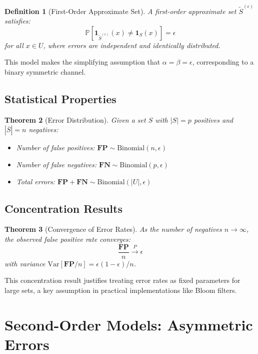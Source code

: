\documentclass[11pt]{article}
\newtheorem{theorem}{Theorem}[section]
\newtheorem{definition}[theorem]{Definition}
\newcommand{\observed}[1]{\tilde{#1}}  %
\newcommand{\prob}[1]{\mathbb{P}\left[#1\right]}
\newcommand{\var}[1]{\text{Var}\left[#1\right]}
\newcommand{\indicator}[1]{\mathbf{1}_{#1}}
\newcommand{\card}[1]{|#1|}
\renewcommand{\complement}[1]{\overline{#1}}
\newcommand{\fprate}{\alpha}  %
\newcommand{\fnrate}{\beta}   %
\newcommand{\RV}[1]{\mathbf{#1}}
\newcommand{\FP}{\RV{FP}}
\newcommand{\FN}{\RV{FN}}
\begin{document}
\begin{definition}[First-Order Approximate Set]
A first-order approximate set $\observed{S}^{(\epsilon)}$ satisfies:
$$\prob{\indicator{\observed{S}^{(\epsilon)}}(x) \neq \indicator{S}(x)} = \epsilon$$
for all $x \in U$, where errors are independent and identically distributed.
\end{definition}

This model makes the simplifying assumption that $\fprate = \fnrate = \epsilon$, corresponding to a binary symmetric channel.

\subsection{Statistical Properties}

\begin{theorem}[Error Distribution]
Given a set $S$ with $\card{S} = p$ positives and $\card{\complement{S}} = n$ negatives:
\begin{itemize}
\item Number of false positives: $\FP \sim \text{Binomial}(n, \epsilon)$
\item Number of false negatives: $\FN \sim \text{Binomial}(p, \epsilon)$
\item Total errors: $\FP + \FN \sim \text{Binomial}(\card{U}, \epsilon)$
\end{itemize}
\end{theorem}

\subsection{Concentration Results}

\begin{theorem}[Convergence of Error Rates]
As the number of negatives $n \to \infty$, the observed false positive rate converges:
$$\frac{\FP}{n} \xrightarrow{P} \epsilon$$
with variance $\var{\FP/n} = \epsilon(1-\epsilon)/n$.
\end{theorem}

This concentration result justifies treating error rates as fixed parameters for large sets, a key assumption in practical implementations like Bloom filters.

\section{Second-Order Models: Asymmetric Errors}
\label{sec:second-order}
\end{document}
